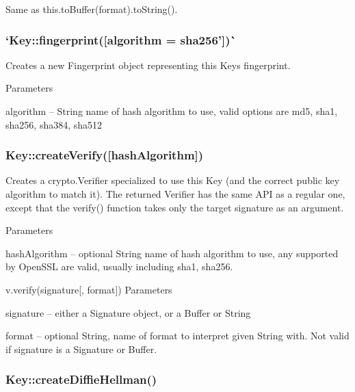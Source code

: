 Same as {\ttfamily this.\+to\+Buffer(format).to\+String()}.

\subsubsection*{`Key\+::fingerprint(\mbox{[}algorithm = \textquotesingle{}sha256'\mbox{]})\`{}}

Creates a new {\ttfamily Fingerprint} object representing this Key\textquotesingle{}s fingerprint.

Parameters


\begin{DoxyItemize}
\item {\ttfamily algorithm} -- String name of hash algorithm to use, valid options are {\ttfamily md5}, {\ttfamily sha1}, {\ttfamily sha256}, {\ttfamily sha384}, {\ttfamily sha512}
\end{DoxyItemize}

\subsubsection*{{\ttfamily Key\+::create\+Verify(\mbox{[}hash\+Algorithm\mbox{]})}}

Creates a {\ttfamily crypto.\+Verifier} specialized to use this Key (and the correct public key algorithm to match it). The returned Verifier has the same A\+PI as a regular one, except that the {\ttfamily verify()} function takes only the target signature as an argument.

Parameters


\begin{DoxyItemize}
\item {\ttfamily hash\+Algorithm} -- optional String name of hash algorithm to use, any supported by Open\+S\+SL are valid, usually including {\ttfamily sha1}, {\ttfamily sha256}.
\end{DoxyItemize}

{\ttfamily v.\+verify(signature\mbox{[}, format\mbox{]})} Parameters


\begin{DoxyItemize}
\item {\ttfamily signature} -- either a Signature object, or a Buffer or String
\item {\ttfamily format} -- optional String, name of format to interpret given String with. Not valid if {\ttfamily signature} is a Signature or Buffer.
\end{DoxyItemize}

\subsubsection*{{\ttfamily Key\+::create\+Diffie\+Hellman()}}

